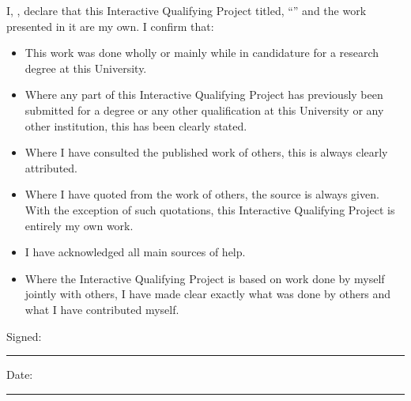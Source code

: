 \documentclass[
11pt, %
english, %
singlespacing, %
headsepline, %
]{MastersDoctoralThesis} %
\begin{document}
\begin{declaration}
\addchaptertocentry{\authorshipname} %
\noindent I, \authorname, declare that this Interactive Qualifying Project titled, \enquote{\ttitle} and the work presented in it are my own. I confirm that:

\begin{itemize} 
\item This work was done wholly or mainly while in candidature for a research degree at this University.
\item Where any part of this Interactive Qualifying Project has previously been submitted for a degree or any other qualification at this University or any other institution, this has been clearly stated.
\item Where I have consulted the published work of others, this is always clearly attributed.
\item Where I have quoted from the work of others, the source is always given. With the exception of such quotations, this Interactive Qualifying Project is entirely my own work.
\item I have acknowledged all main sources of help.
\item Where the Interactive Qualifying Project is based on work done by myself jointly with others, I have made clear exactly what was done by others and what I have contributed myself.\\
\end{itemize}
 
\noindent Signed:\\
\rule[0.5em]{25em}{0.5pt} %
 
\noindent Date:\\
\rule[0.5em]{25em}{0.5pt} %
\end{declaration}

\cleardoublepage

\end{document}

